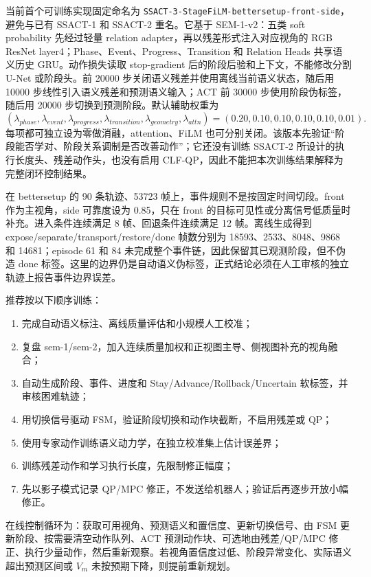 \documentclass[UTF8,a4paper,11pt]{ctexart}
\begin{document}
当前首个可训练实现固定命名为 \texttt{SSACT-3-StageFiLM-bettersetup-front-side}，避免与已有 SSACT-1 和 SSACT-2 重名。它基于 SEM-1-v2：五类 soft probability 先经过轻量 relation adapter，再以残差形式注入对应视角的 RGB ResNet layer4；Phase、Event、Progress、Transition 和 Relation Heads 共享语义历史 GRU。动作损失读取 stop-gradient 后的阶段后验和上下文，不能修改分割 U-Net 或阶段头。前 20000 步关闭语义残差并使用离线当前语义状态，随后用 10000 步线性引入语义残差和预测语义输入；ACT 前 30000 步使用阶段伪标签，随后用 20000 步切换到预测阶段。默认辅助权重为
\begin{equation}
(\lambda_{phase},\lambda_{event},\lambda_{progress},\lambda_{transition},
\lambda_{geometry},\lambda_{attn})=(0.20,0.10,0.10,0.10,0.10,0.01).
\end{equation}
每项都可独立设为零做消融，attention、FiLM 也可分别关闭。该版本先验证“阶段能否学对、阶段关系调制是否改善动作”；它还没有训练 SSACT-2 所设计的执行长度头、残差动作头，也没有启用 CLF-QP，因此不能把本次训练结果解释为完整闭环控制结果。

在 bettersetup 的 90 条轨迹、53723 帧上，事件规则不是按固定时间切段。front 作为主视角，side 可靠度设为 0.85，只在 front 的目标可见性或分离信号低质量时补充。进入条件连续满足 8 帧、回退条件连续满足 12 帧。离线生成得到 expose/separate/transport/restore/done 帧数分别为 18593、2533、8048、9868 和 14681；episode 61 和 84 未完成整个事件链，因此保留其已观测阶段，但不伪造 done 标签。这里的边界仍是自动语义伪标签，正式结论必须在人工审核的独立轨迹上报告事件边界误差。

推荐按以下顺序训练：
\begin{enumerate}[leftmargin=2.3em]
  \item 完成自动语义标注、离线质量评估和小规模人工校准；
  \item 复盘 sem-1/sem-2，加入连续质量加权和正视图主导、侧视图补充的视角融合；
  \item 自动生成阶段、事件、进度和 Stay/Advance/Rollback/Uncertain 软标签，并审核困难轨迹；
  \item 用切换信号驱动 FSM，验证阶段切换和动作块截断，不启用残差或 QP；
  \item 使用专家动作训练语义动力学，在独立校准集上估计误差界；
  \item 训练残差动作和学习执行长度，先限制修正幅度；
  \item 先以影子模式记录 QP/MPC 修正，不发送给机器人；验证后再逐步开放小幅修正。
\end{enumerate}

在线控制循环为：获取可用视角、预测语义和置信度、更新切换信号、由 FSM 更新阶段、按需要清空动作队列、ACT 预测动作块、可选地由残差/QP/MPC 修正、执行少量动作，然后重新观察。若视角置信度过低、阶段异常变化、实际语义超出预测区间或 $V_m$ 未按预期下降，则提前重新规划。
\end{document}
